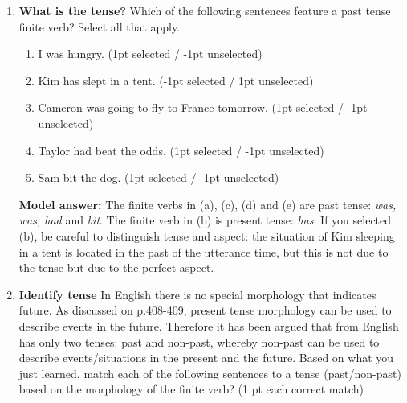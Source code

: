 \documentclass[a4,11pt]{article}
\newcommand{\6}{\mbox{$[\hspace*{-.6mm}[$}}
\newcommand{\9}{\mbox{$]\hspace*{-.6mm}]$}}
\begin{document}
\begin{enumerate}[leftmargin = 12pt]
\begin{enumerate}[noitemsep]
\item now
\item before the the time the speaker got home from the hospital
\item after  the the time the speaker got home from the hospital
\item overlapping with  the time the speaker got home from the hospital
\end{enumerate}


{\bf Model answer} The correct answer is (d). The use of progressive aspect indicates that the situation which is being described overlaps with the topic time. In other words, the wife started writing the letter before the speaker got home from the hospital and she has not finished writing it when the speaker got home.



\item {\bf What is the tense?} Which of the following sentences feature a past tense finite verb? Select all that apply.

\begin{enumerate}[noitemsep]

\item I was hungry.  (1pt selected / -1pt unselected)

\item Kim has slept in a tent. (-1pt selected / 1pt unselected)

\item Cameron was going to fly to France tomorrow. (1pt selected / -1pt unselected)

\item Taylor had beat the odds. (1pt selected / -1pt unselected)

\item Sam bit the dog. (1pt selected / -1pt unselected)

\end{enumerate}

{\bf Model answer:} The finite verbs in (a), (c), (d) and (e) are past tense: {\em was, was, had} and {\em bit}. The finite verb in (b) is present tense: {\em has}. If you selected (b), be careful to distinguish tense and aspect: the situation of Kim sleeping in a tent is located in the past of the utterance time, but this is not due to the tense but due to the perfect aspect.


\item  {\bf Identify tense} In English there is no special morphology that indicates future. As discussed on p.408-409, present tense morphology can be used to describe events in the future. Therefore it has been argued that from English has only two tenses: past and non-past, whereby non-past can be used to describe events/situations in the present and the future. Based on what you just learned, match each of the following sentences to a tense (past/non-past) based on the morphology of the finite verb? (1 pt each correct match)



\end{enumerate}
\end{document}

